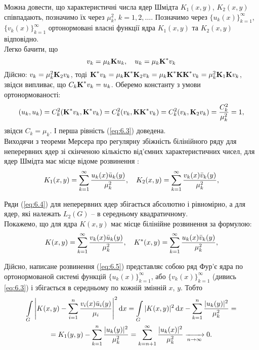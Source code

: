 Можна довести, що характеристичні числа ядер Шмідта $K_1(x, y)$, $K_2(x, y)$ співпадають, позначимо їх через $\mu_k^2$, $k=1,2,\ldots$. Позначимо через $\{u_k(x)\}_{k=1}^\infty$, $\{v_k(x)\}_{k=1}^\infty$ ортонормовані власні функції ядра $K_1(x,y)$ та $K_2(x,y)$ відповідно. \\

Легко бачити, що 
\begin{equation}
	\label{eq:6.3}
	v_k=\mu_k\bf{K}u_k, \quad u_k=\mu_k\bf{K}^*v_k
\end{equation}
Дійсно: $v_k=\mu_k^2\bf{K}_2v_k$, тоді $\bf{K}^*v_k=\mu_k\bf{K}^*\bf{K}_2v_k=\mu_k\bf{K}^*\bf{K}\bf{K}^*v_k=\mu_k^2\bf{K}_1\bf{K}v_k$, звідси випливає, що $C_k\bf{K}^*v_k=u_k$. Оберемо константу з умови ортонормованості: \[ (u_k, u_k) = C_k^2 (\bf{K}^*v_k, \bf{K}^*v_k)=C_k^2(v_k,\bf{K}\bf{K}^*v_k)=C_k^2(v_k,\bf{K}_2v_k)=\dfrac{C_k^2}{\mu_k^2}=1,\] звідси $C_k = \mu_k$. І перша рівність (\ref{eq:6.3}) доведена. \\

Виходячи з теореми Мерсера про регулярну збіжність білінійного ряду для неперервних ядер зі скінченою кількістю від’ємних характеристичних чисел, для ядер Шмідта має місце відоме розвинення :
\begin{equation}
	\label{eq:6.4}
	K_1(x,y)=\Sum_{k=1}^\infty \dfrac{u_k(x)\bar u_k(y)}{\mu_k^2}, \quad K_2(x,y)=\Sum_{k=1}^\infty \dfrac{v_k(x)\bar v_k(y)}{\mu_k^2},
\end{equation}

Ряди (\ref{eq:6.4}) для неперервних ядер збігається абсолютно і рівномірно, а для ядер, які належать $L_2(G)$ -- в середньому квадратичному. \\

Покажемо, що для ядра $K(x,y)$ має місце білінійне розвинення за формулою:
\begin{equation}
	\label{eq:6.5}
	K(x,y)=\Sum_{k=1}^\infty \dfrac{v_k(x)\bar u_k(y)}{\mu_k^2}, \quad K^*(x,y)=\Sum_{k=1}^\infty \dfrac{u_k(x)\bar v_k(y)}{\mu_k^2},
\end{equation}

Дійсно, написане розвинення (\ref{eq:6.5}) представляє собою ряд Фур’є ядра по ортонормованой системі функцій $\{u_k(x)\}_{k=1}^\infty$, або $\{v_k(x)\}_{k=1}^\infty$ (дивись \ref{eq:6.3}) і
збігається в середньому по кожній змінній $x$, $y$. Тобто
\begin{multline*}
	\Int_G \left| K(x,y) - \Sum_{i=1}^n \dfrac{v_i(x) \bar u_i(y)}{\mu_i} \right|^2 \diff x = \Int_G |K(x, y)|^2 \diff x - \Sum_{k=1}^n \dfrac{|u_k(y)|^2}{\mu_k^2} = \\
	= K_1(y, y) - \Sum_{k=1}^n \dfrac{|u_k(y)|^2}{\mu_k^2} = \Sum_{k=n+1}^\infty \dfrac{|u_k(x)|^2}{\mu_k^2} \xrightarrow[n\to\infty]{} 0.
\end{multline*}

